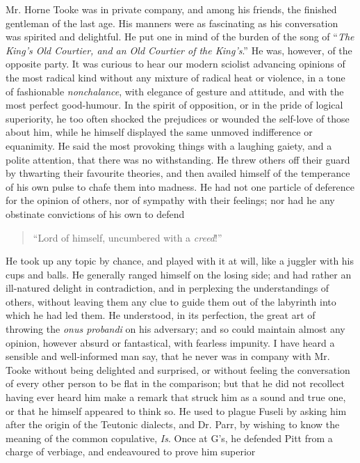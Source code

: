 Mr. Horne Tooke was in private company, and among his friends, the
finished gentleman of the last age. His manners were as
fascinating as his conversation was spirited and delightful. He
put one in mind of the burden of the song of ``\emph{The King's Old
Courtier, and an Old Courtier of the King's}.'' He was, however, of
the opposite party. It was curious to hear our modern sciolist
advancing opinions of the most radical kind without any mixture of
radical heat or violence, in a tone of fashionable \emph{nonchalance},
with elegance of gesture and attitude, and with the most perfect
good-humour. In the spirit of opposition, or in the pride of
logical superiority, he too often shocked the prejudices or
wounded the self-love of those about him, while he himself
displayed the same unmoved indifference or equanimity. He said the
most provoking things with a laughing gaiety, and a polite
attention, that there was no withstanding. He threw others off
their guard by thwarting their favourite theories, and then
availed himself of the temperance of his own pulse to chafe them
into madness. He had not one particle of deference for the opinion
of others, nor of sympathy with their feelings; nor had he any
obstinate convictions of his own to defend
\begin{quote}
  ``Lord of himself, uncumbered with a \emph{creed}!''
\end{quote}
He took up any topic by chance, and played with it at will, like a
juggler with his cups and balls. He generally ranged himself on
the losing side; and had rather an ill-natured delight in
contradiction, and in perplexing the understandings of others,
without leaving them any clue to guide them out of the labyrinth
into which he had led them.  He understood, in its perfection, the
great art of throwing the \emph{onus probandi} on his adversary; and so
could maintain almost any opinion, however absurd or fantastical,
with fearless impunity. I have heard a sensible and well-informed
man say, that he never was in company with Mr. Tooke without being
delighted and surprised, or without feeling the conversation of
every other person to be flat in the comparison; but that he did
not recollect having ever heard him make a remark that struck him
as a sound and true one, or that he himself appeared to think
so. He used to plague Fuseli by asking him after the origin of the
Teutonic dialects, and Dr. Parr, by wishing to know the meaning of
the common copulative, \emph{Is}. Once at G's, he defended Pitt
from a charge of verbiage, and endeavoured to prove him superior
